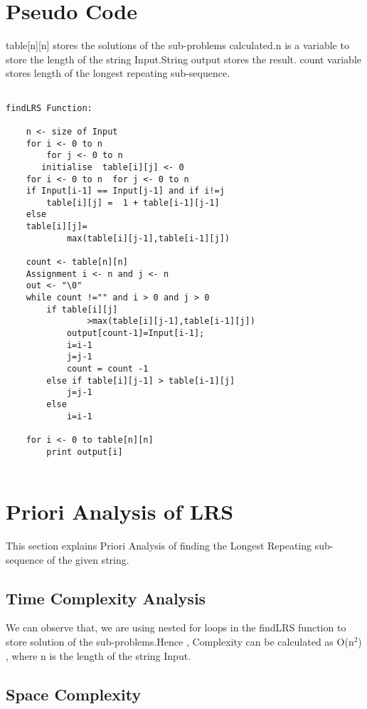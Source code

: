 \documentclass[conference]{IEEEtran}
\begin{document}
\section{Pseudo Code}
table[n][n] stores the solutions of the sub-problems calculated.n is a variable to store the length of the string Input.String output stores the result. count variable stores length of the longest repeating sub-sequence.\\
\begin{lstlisting}

findLRS Function:

    n <- size of Input
    for i <- 0 to n
        for j <- 0 to n
       initialise  table[i][j] <- 0
    for i <- 0 to n  for j <- 0 to n
    if Input[i-1] == Input[j-1] and if i!=j  
        table[i][j] =  1 + table[i-1][j-1]
    else 
    table[i][j]=
            max(table[i][j-1],table[i-1][j])
    
    count <- table[n][n]
    Assignment i <- n and j <- n
    out <- "\0"
    while count !="" and i > 0 and j > 0
        if table[i][j]
                >max(table[i][j-1],table[i-1][j])
            output[count-1]=Input[i-1];
            i=i-1
            j=j-1
            count = count -1
        else if table[i][j-1] > table[i-1][j]
            j=j-1
        else 
            i=i-1
    
    for i <- 0 to table[n][n]
        print output[i]
    
\end{lstlisting}
\section{Priori Analysis of LRS}
This section explains Priori Analysis of finding the Longest Repeating sub-sequence of the given string.

\subsection{Time Complexity Analysis}

We can observe that, we are using nested for loops in the findLRS function to store solution of the sub-problems.Hence , Complexity can be calculated as O(n$^{2}$) , where n is the length of the string Input.

\subsection{Space Complexity}
\end{document}
